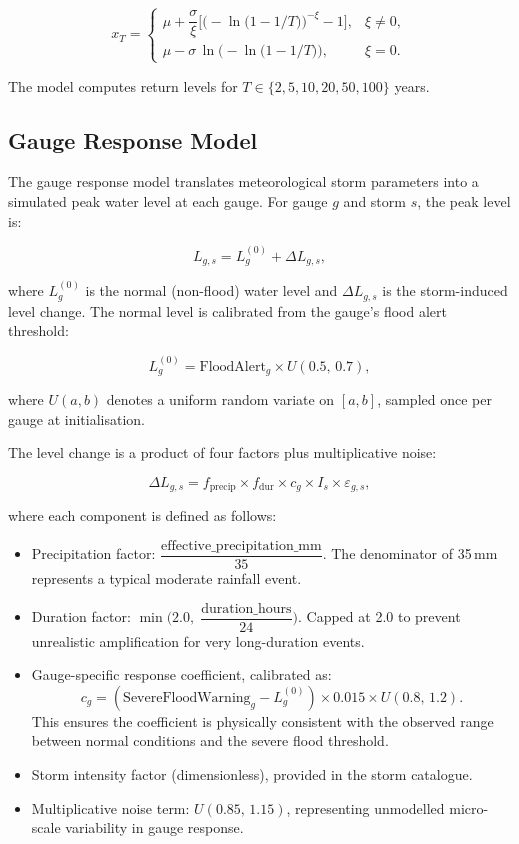 \documentclass[11pt,a4paper]{article}
\begin{document}
\[
x_T =
\begin{cases}
\mu + \dfrac{\sigma}{\xi}\Bigg[\Big(-\ln\!\big(1 - 1/T\big)\Big)^{-\xi} - 1\Bigg], & \xi \neq 0, \\[12pt]
\mu - \sigma\,\ln\!\Big(-\ln\!\big(1 - 1/T\big)\Big), & \xi = 0.
\end{cases}
\]

\noindent The model computes return levels for $T \in \{2, 5, 10, 20, 50, 100\}$ years.

\subsection{Gauge Response Model}

The gauge response model translates meteorological storm parameters into a simulated peak water level at each gauge. For gauge $g$ and storm $s$, the peak level is:

\[
L_{g,s} = L_g^{(0)} + \Delta L_{g,s},
\]

\noindent where $L_g^{(0)}$ is the normal (non-flood) water level and $\Delta L_{g,s}$ is the storm-induced level change. The normal level is calibrated from the gauge's flood alert threshold:

\[
L_g^{(0)} = \text{FloodAlert}_g \times U(0.5,\, 0.7),
\]

\noindent where $U(a, b)$ denotes a uniform random variate on $[a, b]$, sampled once per gauge at initialisation.

The level change is a product of four factors plus multiplicative noise:

\[
\Delta L_{g,s} = f_{\text{precip}} \times f_{\text{dur}} \times c_g \times I_s \times \varepsilon_{g,s},
\]

\noindent where each component is defined as follows:

\begin{itemize}[leftmargin=2.5cm]
    \item[$f_{\text{precip}}$] Precipitation factor: $\dfrac{\text{effective\_precipitation\_mm}}{35}$. The denominator of 35\,mm represents a typical moderate rainfall event.
    \item[$f_{\text{dur}}$] Duration factor: $\min\!\Big(2.0,\;\dfrac{\text{duration\_hours}}{24}\Big)$. Capped at 2.0 to prevent unrealistic amplification for very long-duration events.
    \item[$c_g$] Gauge-specific response coefficient, calibrated as:
    \[
    c_g = (\text{SevereFloodWarning}_g - L_g^{(0)}) \times 0.015 \times U(0.8,\, 1.2).
    \]
    This ensures the coefficient is physically consistent with the observed range between normal conditions and the severe flood threshold.
    \item[$I_s$] Storm intensity factor (dimensionless), provided in the storm catalogue.
    \item[$\varepsilon_{g,s}$] Multiplicative noise term: $U(0.85,\, 1.15)$, representing unmodelled micro-scale variability in gauge response.
\end{itemize}
\end{document}
